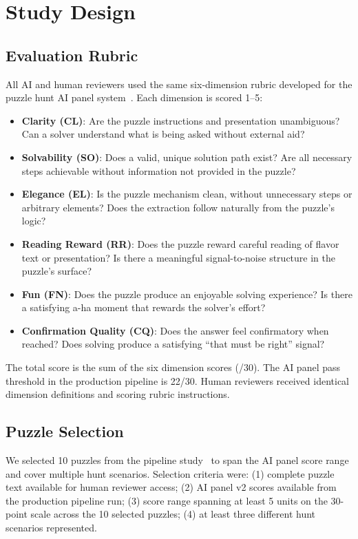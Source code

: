 \section{Study Design}
\label{sec:method}

\subsection{Evaluation Rubric}

All AI and human reviewers used the same six-dimension rubric developed for the puzzle hunt AI panel system~\cite{dellaLibera2025pipeline}. Each dimension is scored 1--5:

\begin{itemize}
  \item \textbf{Clarity (CL)}: Are the puzzle instructions and presentation unambiguous? Can a solver understand what is being asked without external aid?
  \item \textbf{Solvability (SO)}: Does a valid, unique solution path exist? Are all necessary steps achievable without information not provided in the puzzle?
  \item \textbf{Elegance (EL)}: Is the puzzle mechanism clean, without unnecessary steps or arbitrary elements? Does the extraction follow naturally from the puzzle's logic?
  \item \textbf{Reading Reward (RR)}: Does the puzzle reward careful reading of flavor text or presentation? Is there a meaningful signal-to-noise structure in the puzzle's surface?
  \item \textbf{Fun (FN)}: Does the puzzle produce an enjoyable solving experience? Is there a satisfying a-ha moment that rewards the solver's effort?
  \item \textbf{Confirmation Quality (CQ)}: Does the answer feel confirmatory when reached? Does solving produce a satisfying ``that must be right'' signal?
\end{itemize}

The total score is the sum of the six dimension scores (/30). The AI panel pass threshold in the production pipeline is 22/30. Human reviewers received identical dimension definitions and scoring rubric instructions.

\subsection{Puzzle Selection}

We selected 10 puzzles from the pipeline study~\cite{dellaLibera2025pipeline} to span the AI panel score range and cover multiple hunt scenarios. Selection criteria were: (1) complete puzzle text available for human reviewer access; (2) AI panel v2 scores available from the production pipeline run; (3) score range spanning at least 5 units on the 30-point scale across the 10 selected puzzles; (4) at least three different hunt scenarios represented.

